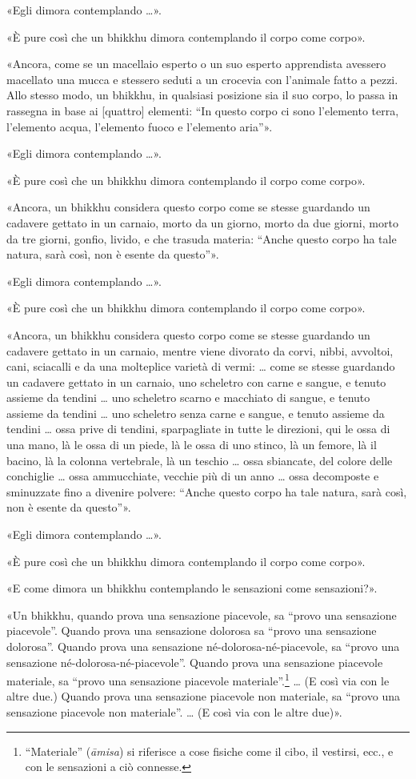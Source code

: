 «Egli dimora contemplando …».


«È pure così che un bhikkhu dimora contemplando il corpo come corpo».


«Ancora, come se un macellaio esperto o un suo esperto apprendista
avessero macellato una mucca e stessero seduti a un crocevia con
l’animale fatto a pezzi. Allo stesso modo, un bhikkhu, in qualsiasi
posizione sia il suo corpo, lo passa in rassegna in base ai [quattro]
elementi: “In questo corpo ci sono l’elemento terra, l’elemento acqua,
l’elemento fuoco e l’elemento aria”».


«Egli dimora contemplando …».


«È pure così che un bhikkhu dimora contemplando il corpo come corpo».


\label{pag270}«Ancora, un bhikkhu considera questo corpo come se stesse guardando un
cadavere gettato in un carnaio, morto da un giorno, morto da due giorni,
morto da tre giorni, gonfio, livido, e che trasuda materia: “Anche
questo corpo ha tale natura, sarà così, non è esente da questo”».


«Egli dimora contemplando …».


«È pure così che un bhikkhu dimora contemplando il corpo come corpo».


«Ancora, un bhikkhu considera questo corpo come se stesse guardando un
cadavere gettato in un carnaio, mentre viene divorato da corvi, nibbi,
avvoltoi, cani, sciacalli e da una molteplice varietà di vermi: … come
se stesse guardando un cadavere gettato in un carnaio, uno scheletro con
carne e sangue, e tenuto assieme da tendini … uno scheletro scarno e
macchiato di sangue, e tenuto assieme da tendini … uno scheletro senza
carne e sangue, e tenuto assieme da tendini … ossa prive di tendini,
sparpagliate in tutte le direzioni, qui le ossa di una mano, là le ossa
di un piede, là le ossa di uno stinco, là un femore, là il bacino, là la
colonna vertebrale, là un teschio … ossa sbiancate, del colore delle
conchiglie … ossa ammucchiate, vecchie più di un anno … ossa decomposte
e sminuzzate fino a divenire polvere: “Anche questo corpo ha tale
natura, sarà così, non è esente da questo”».


«Egli dimora contemplando …».


«È pure così che un bhikkhu dimora contemplando il corpo come corpo».


«E come dimora un bhikkhu contemplando le sensazioni come sensazioni?».


«Un bhikkhu, quando prova una sensazione piacevole, sa “provo una
sensazione piacevole”. Quando prova una sensazione dolorosa sa “provo
una sensazione dolorosa”. Quando prova una sensazione
né-dolorosa-né-piacevole, sa “provo una sensazione
né-dolorosa-né-piacevole”. Quando prova una sensazione piacevole
materiale, sa “provo una sensazione piacevole
materiale”.\footnote{“Materiale” (\emph{āmisa}) si riferisce a cose fisiche come il cibo, il vestirsi, ecc., e con le sensazioni a ciò connesse.} …
(E così via con le altre due.) Quando
prova una sensazione piacevole non materiale, sa “provo una sensazione
piacevole non materiale”. … (E così via con le altre due)».


